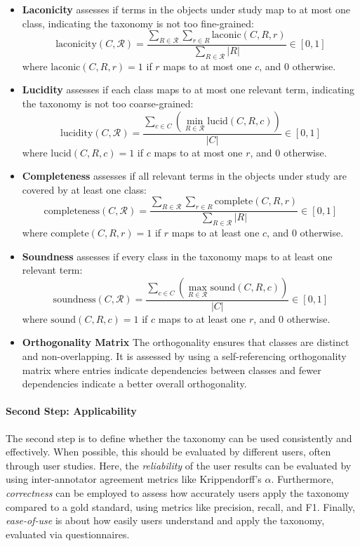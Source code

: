 \begin{itemize}
    \item \textbf{Laconicity} assesses if terms in the objects under study map to at most one class, indicating the taxonomy is not too fine-grained:
    \[
    \text{laconicity}(C, \mathcal{R}) = \frac{\sum_{R \in \mathcal{R}} \sum_{r \in R} \text{laconic}(C, R, r)}{\sum_{R \in \mathcal{R}} |R|} \in [0, 1]
    \]
    where $\text{laconic}(C, R, r) = 1$ if $r$ maps to at most one $c$, and 0 otherwise.

    \item \textbf{Lucidity} assesses if each class maps to at most one relevant term, indicating the taxonomy is not too coarse-grained:
    \[
    \text{lucidity}(C, \mathcal{R}) = \frac{\sum_{c \in C} (\min_{R \in \mathcal{R}} \text{lucid}(C, R, c))}{|C|} \in [0, 1]
    \]
    where $\text{lucid}(C, R, c) = 1$ if $c$ maps to at most one $r$, and 0 otherwise.

    \item \textbf{Completeness} assesses if all relevant terms in the objects under study are covered by at least one class:
    \[
    \text{completeness}(C, \mathcal{R}) = \frac{\sum_{R \in \mathcal{R}} \sum_{r \in R} \text{complete}(C, R, r)}{\sum_{R \in \mathcal{R}} |R|} \in [0, 1]
    \]
    where $\text{complete}(C, R, r) = 1$ if $r$ maps to at least one $c$, and 0 otherwise.

    \item \textbf{Soundness} assesses if every class in the taxonomy maps to at least one relevant term:
    \[
    \text{soundness}(C, \mathcal{R}) = \frac{\sum_{c \in C} (\max_{R \in \mathcal{R}} \text{sound}(C, R, c))}{|C|} \in [0, 1]
    \]
    where $\text{sound}(C, R, c) = 1$ if $c$ maps to at least one $r$, and 0 otherwise.

    \item \textbf{Orthogonality Matrix} The orthogonality ensures that classes are distinct and non-overlapping. It is assessed by using a self-referencing orthogonality matrix where entries indicate dependencies between classes and fewer dependencies indicate a better overall orthogonality.
\end{itemize}


\paragraph{Second Step: Applicability} The second step is to define whether the taxonomy can be used consistently and effectively. When possible, this should be evaluated by different users, often through user studies. Here, the \emph{reliability} of the user results can be evaluated by using inter-annotator agreement metrics like Krippendorff's $\alpha$. Furthermore, \emph{correctness} can be employed to assess how accurately users apply the taxonomy compared to a gold standard, using metrics like precision, recall, and F1. Finally, \emph{ease-of-use} is about how easily users understand and apply the taxonomy, evaluated via questionnaires.

